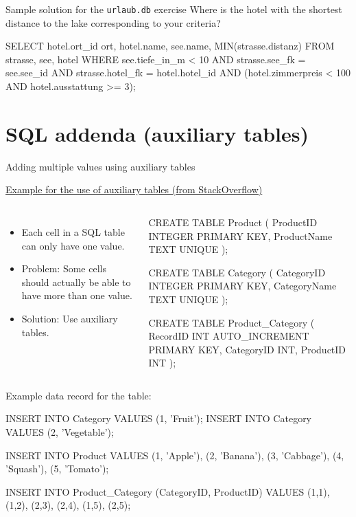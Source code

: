 \begin{frame}{Sample solution for the \texttt{urlaub.db} exercise}
Where is the hotel with the shortest distance to the lake corresponding to your criteria?
\begin{sqlcode}
SELECT hotel.ort_id ort, hotel.name, 
       see.name, MIN(strasse.distanz)
FROM strasse, see, hotel 
WHERE see.tiefe_in_m < 10  AND strasse.see_fk = see.see_id 
    AND strasse.hotel_fk = hotel.hotel_id 
    AND (hotel.zimmerpreis < 100 AND hotel.ausstattung >= 3);
\end{sqlcode}
\end{frame}




\section{SQL addenda (auxiliary tables)}
\begin{frame}{Adding multiple values using auxiliary tables}
\footnotesize

\href{https://stackoverflow.com/questions/13487671/add-multiple-values-in-one-column}{Example for the use of auxiliary tables (from StackOverflow)}

\begin{columns}
  \begin{itemize}
      \item Each cell in a SQL table can only have one value. 
      \item \alert{Problem:} Some cells should actually be able to have more than one value.
      \item \alert{Solution:} Use auxiliary tables.
  \end{itemize}
\begin{sqlcode}
CREATE TABLE Product (
  ProductID INTEGER PRIMARY KEY,
  ProductName TEXT UNIQUE
);

CREATE TABLE Category (
  CategoryID INTEGER PRIMARY KEY,
  CategoryName TEXT UNIQUE
);

CREATE TABLE Product_Category (
  RecordID INT AUTO_INCREMENT PRIMARY KEY,
  CategoryID INT,
  ProductID INT
);
\end{sqlcode}
\end{columns}

\framebreak 

Example data record for the table:
\begin{sqlcode}
INSERT INTO Category VALUES (1, 'Fruit');
INSERT INTO Category VALUES (2, 'Vegetable');

INSERT INTO Product 
VALUES (1, 'Apple'),
       (2, 'Banana'), 
       (3, 'Cabbage'),
       (4, 'Squash'),
       (5, 'Tomato');

INSERT INTO Product_Category (CategoryID, ProductID) 
VALUES (1,1), (1,2), (2,3), (2,4), (1,5), (2,5);
\end{sqlcode}

\end{frame}



